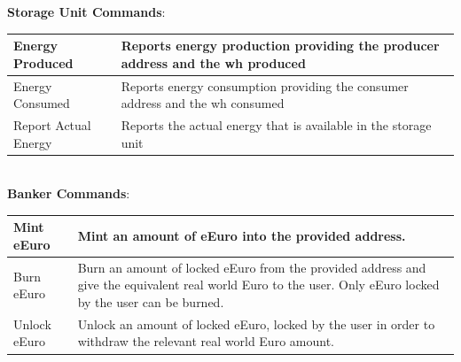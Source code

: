 \textbf{Storage Unit Commands}:\\
\begin{tabular}{|p{5.5cm}|p{8cm}|}
    \hline
    Energy Produced & Reports energy production providing the producer address and the wh produced \\ \hline
    Energy Consumed & Reports energy consumption providing the consumer address and the wh consumed \\ \hline
    Report Actual Energy & Reports the actual energy that is available in the storage unit  \\ \hline
\end{tabular}\\

\textbf{Banker Commands}:\\
\begin{tabular}{|p{5.5cm}|p{8cm}|}
    \hline
    Mint eEuro & Mint an amount of eEuro into the provided address. \\ \hline
    Burn eEuro & Burn an amount of locked eEuro from the provided address and give the equivalent real world Euro to the user. Only eEuro locked by the user can be burned. \\ \hline
    Unlock eEuro & Unlock an amount of locked eEuro, locked by the user in order to withdraw the relevant real world Euro amount. \\ \hline
\end{tabular}\\

